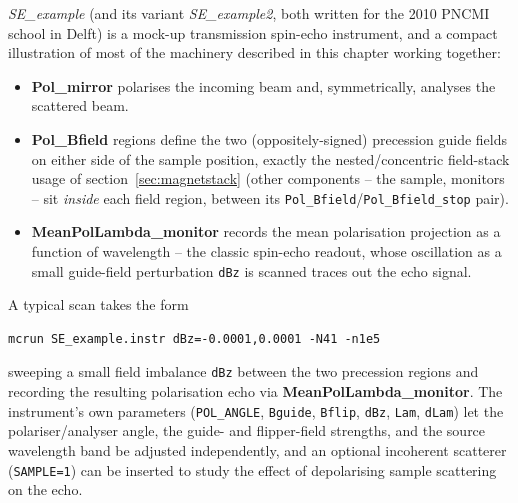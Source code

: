 \textit{SE\_example} (and its variant \textit{SE\_example2}, both written
for the 2010 PNCMI school in Delft) is a mock-up transmission spin-echo
instrument, and a compact illustration of most of the machinery described
in this chapter working together:
\begin{itemize}
\item \textbf{Pol\_mirror} polarises the incoming beam and, symmetrically,
  analyses the scattered beam.
\item \textbf{Pol\_Bfield} regions define the two (oppositely-signed)
  precession guide fields on either side of the sample position, exactly
  the nested/concentric field-stack usage of section~\ref{sec:magnetstack}
  (other components -- the sample, monitors -- sit \emph{inside} each
  field region, between its \texttt{Pol\_Bfield}/\texttt{Pol\_Bfield\_stop}
  pair).
\item \textbf{MeanPolLambda\_monitor} records the mean polarisation
  projection as a function of wavelength -- the classic spin-echo readout,
  whose oscillation as a small guide-field perturbation \texttt{dBz} is
  scanned traces out the echo signal.
\end{itemize}
A typical scan takes the form
\begin{lstlisting}
mcrun SE_example.instr dBz=-0.0001,0.0001 -N41 -n1e5
\end{lstlisting}
sweeping a small field imbalance \texttt{dBz} between the two precession
regions and recording the resulting polarisation echo via
\textbf{MeanPolLambda\_monitor}. The instrument's own parameters
(\texttt{POL\_ANGLE}, \texttt{Bguide}, \texttt{Bflip}, \texttt{dBz},
\texttt{Lam}, \texttt{dLam}) let the polariser/analyser angle, the guide-
and flipper-field strengths, and the source wavelength band be adjusted
independently, and an optional incoherent scatterer (\texttt{SAMPLE=1})
can be inserted to study the effect of depolarising sample scattering on
the echo.
